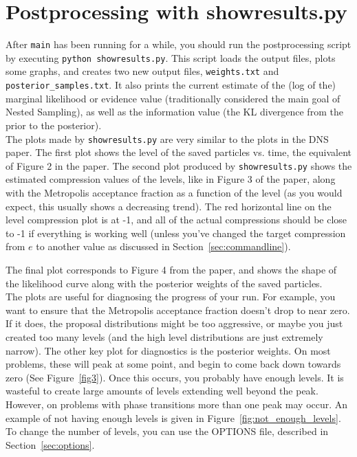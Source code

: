 \documentclass[a4paper, 11pt]{article}
\begin{document}
\section{Postprocessing with showresults.py}
After {\tt main} has been running for
a while, you should run the postprocessing script
by executing {\tt python showresults.py}. This script loads the output files,
plots some graphs, and creates two new output files, {\tt weights.txt} and
{\tt posterior\_samples.txt}. It also prints the current estimate of the
(log of the) marginal likelihood or evidence value (traditionally considered
the main goal of Nested Sampling), as well as the information value (the KL
divergence from the prior to the posterior).\\

The plots made by {\tt showresults.py} are very similar to the plots in
the DNS paper. The first plot shows the level of the saved particles vs.
time, the equivalent of Figure 2 in the paper. The second plot produced by
{\tt showresults.py} shows the estimated compression values of the levels,
like in Figure 3 of the paper, along with the Metropolis acceptance fraction
as a function of the level (as you would expect, this usually shows a
decreasing trend). The red horizontal line on the level compression plot is
at -1, and all of the actual compressions should be close to -1 if everything
is working well (unless you've changed the target compression from $e$ to
another value as discussed in Section~\ref{sec:commandline}).

The final plot corresponds to Figure 4 from the paper, and
shows the shape of the likelihood curve along with the posterior weights of
the saved particles.\\

The plots are useful for diagnosing the progress of your run. For example, you
want to ensure that the Metropolis acceptance fraction doesn't drop to near
zero. If it does, the proposal distributions might be too aggressive, or maybe
you just created too many levels (and the high level distributions are just
extremely narrow). The other key plot for diagnostics is the posterior
weights. On most problems, these will peak at some point, and begin to
come back down towards zero (See Figure~\ref{fig3}).
Once this occurs, you probably have enough levels.
It is wasteful to create large amounts of levels extending well beyond the peak.
However, on problems with phase transitions more than one peak may occur.
An example of not having enough levels is given in
Figure~\ref{fig:not_enough_levels}. To change the number of levels, you
can use the OPTIONS file, described in Section~\ref{sec:options}.\\
\end{document}
